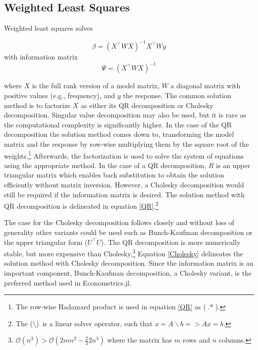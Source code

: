 \documentclass{juliacon}
\DeclareMathOperator{\HadamardProduct}{.*}
\begin{document}
\subsection{Weighted Least Squares}

Weighted least squares solves

\begin{equation}
	\beta = \left(X^{\top} W X\right)^{-1} X^{\top} W y
\end{equation}
with information matrix
\begin{equation}
\Psi = \left(X^{\top} W X\right)^{-1}
\end{equation}

where $X$ is the full rank version of a model matrix, $W$ a diagonal matrix with positive values (e.g., frequency), and $y$ the response. The common solution method is to factorize $X$ as either its QR decomposition or Cholesky decomposition. Singular value decomposition may also be used, but it is rare as the computational complexity is significantly higher. In the case of the QR decomposition the solution method comes down to, transforming the model matrix and the response by row-wise multiplying them by the square root of the weights.\footnote{The row-wise Hadamard product is used in equation \ref{QR} as ($\HadamardProduct$).} Afterwards, the factorization is used to solve the system of equations using the appropriate method. In the case of a QR decomposition, $R$ is an upper triangular matrix which enables back substitution to obtain the solution efficiently without matrix inversion. However, a Cholesky decomposition would still be required if the information matrix is desired. The solution method with QR decomposition is delineated in equation \ref{QR}.\footnote{The (\textbackslash)\ is a linear solver operator, such that $x = A \backslash b => Ax = b$.}

The case for the Cholesky decomposition follows closely and without loss of generality other variants could be used such as Bunch-Kaufman decomposition or the upper triangular form ($U^{\top}U$). The QR decomposition is more numerically stable, but more expensive than Cholesky.\footnote{$\mathcal{O}\left(n^{3}\right) > \mathcal{O}\left(2mn^{2}-\frac{2}{3}2n^{3}\right)$ where the matrix has $m$ rows and $n$ columns.} Equation \ref{Cholesky} delineates the solution method with Cholesky decomposition. Since the information matrix is an important component, Bunch-Kaufman decomposition, a Cholesky variant, is the preferred method used in Econometrics.jl.
\end{document}
